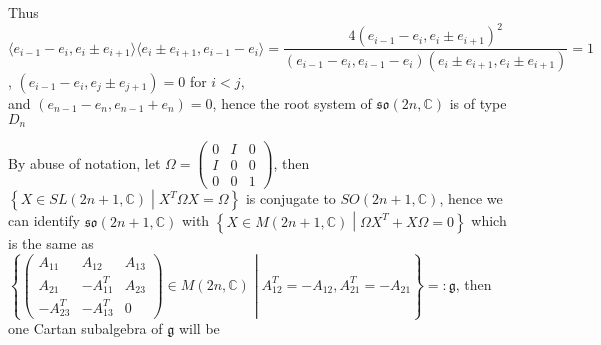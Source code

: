 \documentclass[10pt]{article}
\newcommand{\<}[1]{\langle #1 \rangle}
\begin{document}
Thus $\langle e_{i-1}-e_i,e_i\pm e_{i+1}\rangle\langle e_i\pm e_{i+1},e_{i-1}-e_i\rangle=\dfrac{4(e_{i-1}-e_i,e_i\pm e_{i+1})^2}{(e_{i-1}-e_i,e_{i-1}-e_i)(e_i\pm e_{i+1},e_i\pm e_{i+1})}=1$, $( e_{i-1}-e_i,e_j\pm e_{j+1})=0$ for $i<j$, \\
and $(e_{n-1}-e_n,e_{n-1}+e_n)=0$, hence the root system of $\mathfrak{so}(2n,\mathbb C)$ is of type $D_n$ \\
\begin{center}
\end{center}
By abuse of notation, let $\Omega=\begin{pmatrix}
0&I&0 \\
I&0&0 \\
0&0&1
\end{pmatrix}$, then $\left\{X\in SL(2n+1,\mathbb C)\middle|X^T\Omega X=\Omega\right\}$ is conjugate to $SO(2n+1,\mathbb C)$, hence we can identify $\mathfrak{so}(2n+1,\mathbb C)$ with $\left\{X\in M(2n+1,\mathbb C)\middle|\Omega X^T+X\Omega=0\right\}$ which is the same as \\
$\left\{\begin{pmatrix}
A_{11}&A_{12}&A_{13} \\
A_{21}&-A_{11}^T&A_{23}\\
-A_{23}^T&-A_{13}^T&0
\end{pmatrix}\in M(2n,\mathbb C)\middle| A_{12}^T=-A_{12},A_{21}^T=-A_{21}\right\}=:\mathfrak{g}$, then one Cartan subalgebra of $\mathfrak{g}$ will be \\
\end{document}
